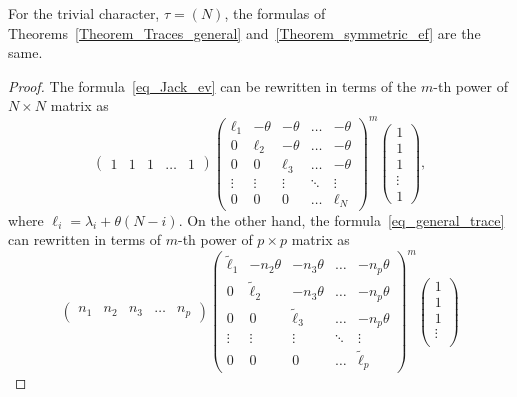 \begin{lemma} \label{Lemma_symmetric_ev_match} For the trivial character, $\tau=(N)$, the formulas of Theorems~\ref{Theorem_Traces_general} and~\ref{Theorem_symmetric_ef} are the same.
\end{lemma}
\begin{proof} The formula~\eqref{eq_Jack_ev} can be rewritten in terms of the $m$-th power of $N\times N$ matrix as
\begin{equation}
\label{eq_x12}
\begin{pmatrix}
1 & 1 & 1 & \ldots & 1
\end{pmatrix}
\begin{pmatrix}
\ell_{1} & -\theta & -\theta & \ldots & -\theta\\
0 & \ell_{2} & -\theta & \ldots & -\theta\\
0 & 0 & \ell_{3} & \ldots & -\theta\\
\vdots & \vdots & \vdots & \ddots & \vdots\\
0 & 0 & 0 & \ldots &  \ell_{N}
\end{pmatrix}
^{m}
\begin{pmatrix}
1\\
1\\
1\\
\vdots\\
1
\end{pmatrix},
\end{equation}
where $\ell_i=\lambda_i+\theta(N-i)$. On the other hand, the formula~\eqref{eq_general_trace} can rewritten in terms of $m$-th power of $p\times p$ matrix as
\begin{equation}
\label{eq_x13}
\begin{pmatrix}
n_{1} & n_{2} & n_{3} & \ldots & n_{p}
\end{pmatrix}
\begin{pmatrix}
\tilde \ell_{1} & -n_{2}\theta & -n_{3}\theta & \ldots & -n_{p}\theta\\
0 & \tilde \ell_{2} & -n_{3}\theta & \ldots & -n_{p}\theta\\
0 & 0 & \tilde \ell_{3} & \ldots & -n_{p}\theta\\
\vdots & \vdots & \vdots & \ddots & \vdots\\
0 & 0 & 0 & \ldots & \tilde \ell_{p}
\end{pmatrix}
^{m}
\begin{pmatrix}
1\\
1\\
1\\
\vdots\\

\end{pmatrix}
\end{equation}
\end{proof}
